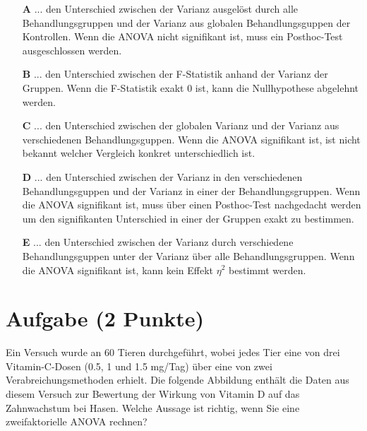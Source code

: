 \documentclass[a4paper, 9pt]{scrartcl}\usepackage[]{graphicx}\usepackage[]{xcolor}
\begin{document}
\begin{enumerate}
\item [\textbf{A} \msquare] ... den Unterschied zwischen der Varianz ausgelöst durch alle Behandlungsgruppen und der Varianz aus globalen Behandlungsguppen der Kontrollen. Wenn die ANOVA nicht signifikant ist, muss ein Posthoc-Test ausgeschlossen werden.
\item [\textbf{B} \msquare] ... den Unterschied zwischen der F-Statistik anhand der Varianz der Gruppen. Wenn die F-Statistik exakt 0 ist, kann die Nullhypothese abgelehnt werden.
\item [\textbf{C} \msquare] ... den Unterschied zwischen der globalen Varianz und der Varianz aus verschiedenen Behandlungsguppen. Wenn die ANOVA signifikant ist, ist nicht bekannt welcher Vergleich konkret unterschiedlich ist.
\item [\textbf{D} \msquare] ... den Unterschied zwischen der Varianz in den verschiedenen Behandlungsguppen und der Varianz in einer der Behandlungsgruppen. Wenn die ANOVA signifikant ist, muss über einen Posthoc-Test nachgedacht werden um den signifikanten Unterschied in einer der Gruppen exakt zu bestimmen.
\item [\textbf{E} \msquare] ... den Unterschied zwischen der Varianz durch verschiedene Behandlungsguppen unter der Varianz über alle Behandlungsgruppen. Wenn die ANOVA signifikant ist, kann kein Effekt $\eta^2$ bestimmt werden.
\end{enumerate} 

\section{Aufgabe \hfill (2 Punkte)}



Ein Versuch wurde an 60 Tieren durchgeführt, wobei jedes Tier eine von drei Vitamin-C-Dosen (0.5, 1 und 1.5 mg/Tag) über eine von zwei Verabreichungsmethoden erhielt. Die folgende Abbildung enthält die Daten aus diesem Versuch zur Bewertung der Wirkung von Vitamin D auf das Zahnwachstum bei Hasen.  Welche Aussage ist richtig, wenn Sie eine zweifaktorielle ANOVA rechnen?
\end{document}
